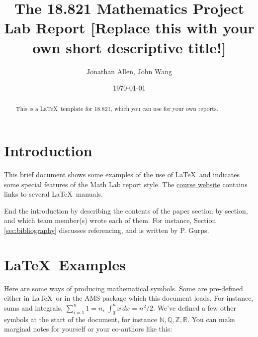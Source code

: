 \documentclass[12pt]{amsart}   %
\begin{document}
\title[The 18.821 report]{The 18.821 Mathematics Project Lab Report 
[Replace this with your own short descriptive title!]} 
 
\author{Jonathan Allen, John Wang}
\date{\today}              %


\newcommand{\C}{\mathbb C} %
\newcommand{\R}{\mathbb R} 
\newcommand{\Z}{\mathbb Z}
\newcommand{\Q}{\mathbb Q}
\newcommand{\N}{\mathbb N}

\begin{abstract}
This is a \LaTeX\ template for 18.821, which you can use for your
own reports. 
\end{abstract}

\maketitle

\section{Introduction\label{sec:intro}}


This brief document shows some examples of the use of \LaTeX\  
and indicates some special features of the Math Lab report style.
The \href{http://stellar.mit.edu/S/course/18/sp13/18.821/}{course website}
contains links to several \LaTeX\ manuals. 

End the introduction by describing the contents of the paper section by section, and which
team member(s) wrote each of them. For instance, Section \ref{sec:bibliography} discusses referencing, and is written by P. Gurps.



\section{\LaTeX\ Examples\label{sec:examples}}


Here are some ways of producing mathematical symbols. Some are pre-defined either in \LaTeX\ or in the AMS package which
this document loads. For instance, sums and integrals, $\sum_{i=1}^n 1 = n$, $\int_0^n x \, dx = n^2/2$.
We've defined a few other symbols at the start of the document, for instance $\N,\Q,\Z,\R$. You can make marginal notes for yourself or your co-authors like this:
\marginpar{Unfinished here?}
\end{document}
